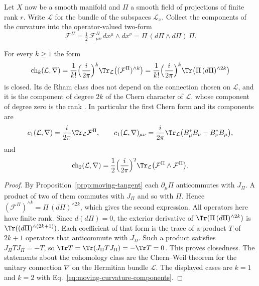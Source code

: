 Let $X$ now be a smooth manifold and $\Pi$ a smooth field of projections of finite rank $r$. Write $\mathcal L$ for the bundle of the subspaces $\mathcal L_x$. Collect the components of the curvature into the operator-valued two-form
\begin{equation}
 \mathcal F^\Pi=\tfrac12\,\mathcal F^\Pi_{\mu\nu}\,dx^\mu\wedge dx^\nu=\Pi\,(d\Pi\wedge d\Pi)\,\Pi .
 \label{eq:moving-curvature-form}
\end{equation}

\begin{proposition}
\label{prop:moving-chern}
For every $k\ge1$ the form
\begin{equation}
 \operatorname{ch}_k(\mathcal L,\nabla)
 =\frac1{k!}\Bigl(\frac{i}{2\pi}\Bigr)^k\Tr_{\mathcal L}\bigl((\mathcal F^\Pi)^{\wedge k}\bigr)
 =\frac1{k!}\Bigl(\frac{i}{2\pi}\Bigr)^k\Tr\bigl(\Pi\,(d\Pi)^{\wedge 2k}\bigr)
 \label{eq:moving-chern-character}
\end{equation}
is closed. Its de Rham class does not depend on the connection chosen on $\mathcal L$, and it is the component of degree $2k$ of the Chern character of $\mathcal L$, whose component of degree zero is the rank \cite{KobayashiNomizu,Husemoller}. In particular the first Chern form and its components are
\begin{equation}
 c_1(\mathcal L,\nabla)=\frac{i}{2\pi}\Tr_{\mathcal L}\mathcal F^\Pi,\qquad
 c_1(\mathcal L,\nabla)_{\mu\nu}=\frac{i}{2\pi}\Tr_{\mathcal L}\bigl(B_\mu^*B_\nu-B_\nu^*B_\mu\bigr),
 \label{eq:moving-first-chern}
\end{equation}
and
\begin{equation}
 \operatorname{ch}_2(\mathcal L,\nabla)=\frac12\Bigl(\frac{i}{2\pi}\Bigr)^2\Tr_{\mathcal L}\bigl(\mathcal F^\Pi\wedge\mathcal F^\Pi\bigr).
 \label{eq:moving-second-chern}
\end{equation}
\end{proposition}
\begin{proof}
By Proposition~\ref{prop:moving-tangent} each $\partial_\mu\Pi$ anticommutes with $J_\Pi$. A product of two of them commutes with $J_\Pi$ and so with $\Pi$. Hence $(\mathcal F^\Pi)^{\wedge k}=\Pi\,(d\Pi)^{\wedge 2k}$, which gives the second expression. All operators here have finite rank. Since $d(d\Pi)=0$, the exterior derivative of $\Tr(\Pi\,(d\Pi)^{\wedge 2k})$ is $\Tr((d\Pi)^{\wedge(2k+1)})$. Each coefficient of that form is the trace of a product $T$ of $2k+1$ operators that anticommute with $J_\Pi$. Such a product satisfies $J_\Pi TJ_\Pi=-T$, so $\Tr T=\Tr(J_\Pi TJ_\Pi)=-\Tr T=0$. This proves closedness. The statements about the cohomology class are the Chern--Weil theorem for the unitary connection $\nabla$ on the Hermitian bundle $\mathcal L$. The displayed cases are $k=1$ and $k=2$ with Eq.~\eqref{eq:moving-curvature-components}.
\end{proof}

